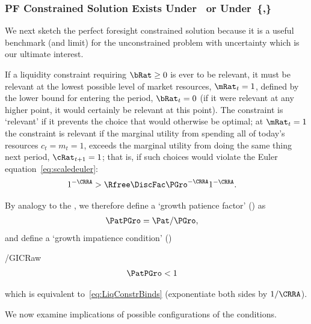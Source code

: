 \documentclass[ProjectDLO]{subfiles}
\begin{document}
\hypertarget{PF-Constrained-Solution}{}
\hypertarget{Constrained-Solution}{}
\subsubsection{PF Constrained Solution Exists Under~\texorpdfstring{{\RIC}}{RIC} or Under~\texorpdfstring{\{\cncl{\RIC},\GICRaw\}}{RIC-Fails,GIC}}\label{subsec:PFCon}

We next sketch the perfect foresight constrained solution because it is a useful benchmark (and limit) for the unconstrained problem with uncertainty which is our ultimate interest.

If a liquidity constraint requiring $\bRat \geq 0$ is ever to be relevant, it must be relevant at the lowest possible level of market resources, $\mRat_{t}=1$, defined by the lower bound for entering the period, $\bRat_{t}=0$ (if it were relevant at any higher point, it would certainly be relevant at this point).  The constraint is `relevant' if it prevents the choice that would otherwise be optimal; at $\mRat_{t}=1$ the constraint is relevant if the marginal utility from spending all of today's resources $c_{t}=m_{t}=1$, exceeds the marginal utility from doing the same thing next period, $\cRat_{t+1}=1$; that is, if such choices would violate the Euler equation~\eqref{eq:scaledeuler}:
\begin{align}
  1^{-\CRRA}  & > \Rfree \DiscFac \PGro^{-\CRRA}1^{-\CRRA}  \label{eq:LiqConstrBinds}.
\end{align}

\hypertarget{GPFRaw}{}
\hypertarget{GICRaw}{}
By analogy to the \RPF, we therefore define a `growth patience factor' (\GPFRaw) as
\begin{align}
  \PatPGro  & = {\Pat}/\PGro,  \label{eq:GPFRaw}
\end{align}
and define a `growth impatience condition' (\GICRaw)
\begin{verbatimwrite}{\EqDir/GICRaw}
\begin{align}
  \PatPGro &  < 1   \label{eq:GICRaw}
\end{align}
\end{verbatimwrite}

which is equivalent to~\eqref{eq:LiqConstrBinds} (exponentiate both
sides by $1/\CRRA$).

We now examine implications of possible configurations of the conditions.
\end{document}
